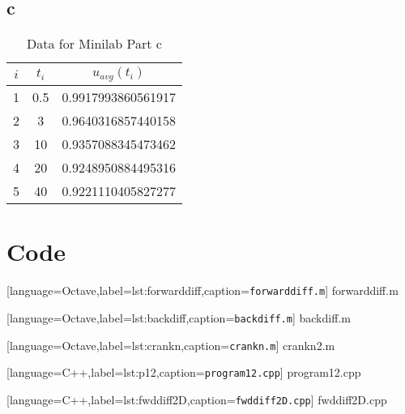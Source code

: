 \documentclass[12pt]{article}
\begin{document}
\subsection{c}
\begin{table}[H]
  \centering
  \begin{tabular}[H]{ccc}
    \hline 
    $i$ & $t_i$ & $u_{avg}(t_i)$ \\
    \hline
    1 & 0.5 & 0.9917993860561917 \\
    2 & 3   & 0.9640316857440158 \\
    3 & 10  & 0.9357088345473462 \\
    4 & 20  & 0.9248950884495316 \\
    5 & 40  & 0.9221110405827277 \\
    \hline
  \end{tabular}
  \caption{Data for Minilab Part c}
  \label{tab:mini_c}
\end{table}
\section{Code}

[language=Octave,label=lst:forwarddiff,caption=\texttt{forwarddiff.m}]
{forwarddiff.m}
\pagebreak

[language=Octave,label=lst:backdiff,caption=\texttt{backdiff.m}]
{backdiff.m}
\pagebreak

[language=Octave,label=lst:crankn,caption=\texttt{crankn.m}]
{crankn2.m}
\pagebreak

[language=C++,label=lst:p12,caption=\texttt{program12.cpp}]
{program12.cpp}
\pagebreak

[language=C++,label=lst:fwddiff2D,caption=\texttt{fwddiff2D.cpp}]
{fwddiff2D.cpp}
\end{document}
